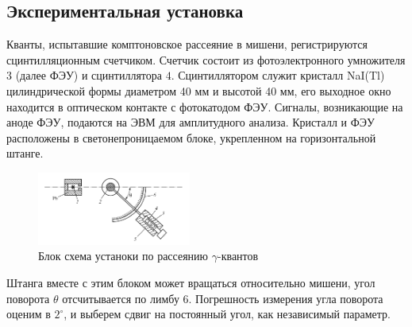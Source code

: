 \subsection*{Экспериментальная установка}

Кванты, испытавшие комптоновское рассеяние в мишени, регистрируются сцинтилляционным счетчиком. Счетчик состоит из фотоэлектронного умножителя 3 (далее ФЭУ) и сцинтиллятора $4$. Сцинтиллятором служит кристалл NaI(Tl) цилиндрической формы диаметром 40 мм и высотой 40 мм, его выходное окно находится в оптическом контакте с фотокатодом ФЭУ. Сигналы, возникающие на аноде ФЭУ, подаются на ЭВМ для амплитудного анализа. Кристалл и ФЭУ расположены в светонепроницаемом блоке, укрепленном на горизонтальной штанге. 

\begin{figure}[h]
    \centering
    \includegraphics[width=0.45\textwidth]{figures/exp.png}
    \caption{Блок схема устаноки по рассеянию $\gamma$-квантов}
    \label{fig:exp}
\end{figure}

Штанга вместе с этим блоком может вращаться относительно мишени, угол поворота $\theta$ отсчитывается по лимбу $6$. 
Погрешность измерения угла поворота оценим в $2^{\circ}$, и выберем сдвиг на постоянный угол, как независимый параметр.
